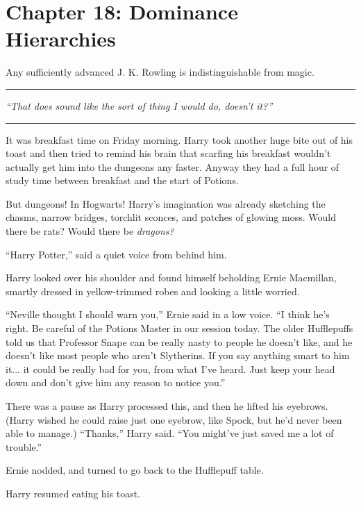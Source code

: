 \chapter{Chapter 18: Dominance Hierarchies}
Any sufficiently advanced J. K. Rowling is indistinguishable from magic.

\begin{center}\rule{3in}{0.4pt}\end{center}

\emph{``That does sound like the sort of thing I would do, doesn't it?''}

\begin{center}\rule{3in}{0.4pt}\end{center}

It was breakfast time on Friday morning. Harry took another huge bite out of his toast and then tried to remind his brain that scarfing his breakfast wouldn't actually get him into the dungeons any faster. Anyway they had a full hour of study time between breakfast and the start of Potions.

But dungeons! In Hogwarts! Harry's imagination was already sketching the chasms, narrow bridges, torchlit sconces, and patches of glowing moss. Would there be rats? Would there be \emph{dragons?}

``Harry Potter,'' said a quiet voice from behind him.

Harry looked over his shoulder and found himself beholding Ernie Macmillan, smartly dressed in yellow-trimmed robes and looking a little worried.

``Neville thought I should warn you,'' Ernie said in a low voice. ``I think he's right. Be careful of the Potions Master in our session today. The older Hufflepuffs told us that Professor Snape can be really nasty to people he doesn't like, and he doesn't like most people who aren't Slytherins. If you say anything smart to him it... it could be really bad for you, from what I've heard. Just keep your head down and don't give him any reason to notice you.''

There was a pause as Harry processed this, and then he lifted his eyebrows. (Harry wished he could raise just one eyebrow, like Spock, but he'd never been able to manage.) ``Thanks,'' Harry said. ``You might've just saved me a lot of trouble.''

Ernie nodded, and turned to go back to the Hufflepuff table.

Harry resumed eating his toast.

